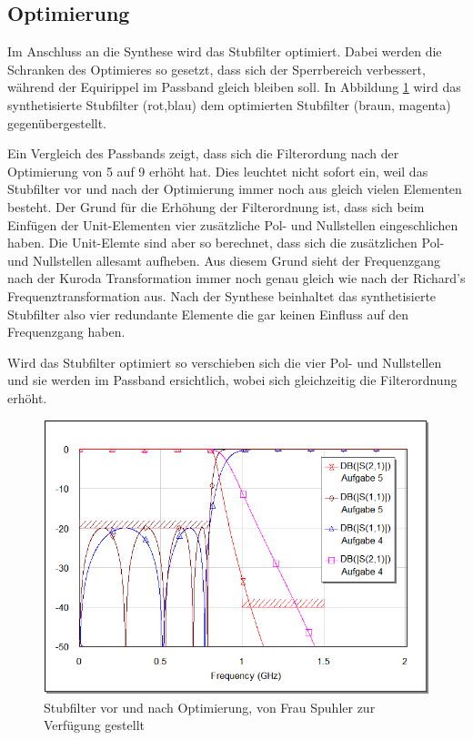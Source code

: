 \subsection{Optimierung}

Im Anschluss an die Synthese wird das Stubfilter optimiert. Dabei  werden  die
Schranken  des  Optimieres so gesetzt, dass sich der Sperrbereich  verbessert,
während  der  Equirippel  im   Passband  gleich  bleiben  soll.  In  Abbildung
\ref{fig:vor-nach-optimierung} wird  das  synthetisierte Stubfilter (rot,blau)
dem optimierten Stubfilter (braun, magenta) gegenübergestellt.

Ein Vergleich des  Passbands  zeigt,  dass  sich  die  Filterordung  nach  der
Optimierung  von 5 auf 9 erhöht hat. Dies leuchtet nicht sofort ein, weil  das
Stubfilter vor und nach der Optimierung immer noch aus gleich vielen Elementen
besteht.  Der  Grund  für die Erhöhung der Filterordnung ist, dass  sich  beim
Einfügen   der   Unit-Elementen   vier   zusätzliche   Pol-  und   Nullstellen
eingeschlichen  haben. Die Unit-Elemte sind aber so berechnet, dass  sich  die
zusätzlichen  Pol- und Nullstellen allesamt aufheben. Aus diesem  Grund  sieht
der  Frequenzgang nach der Kuroda Transformation immer noch genau  gleich  wie
nach  der Richard's Frequenztransformation aus. Nach der  Synthese  beinhaltet
das synthetisierte  Stubfilter  also  vier  redundante Elemente die gar keinen
Einfluss auf den Frequenzgang haben.

Wird  das  Stubfilter   optimiert  so  verschieben  sich  die  vier  Pol-  und
Nullstellen  und sie werden im Passband ersichtlich, wobei  sich  gleichzeitig
die Filterordnung erhöht.


\begin{figure}[h!]
    \centering
    \includegraphics[width=\linewidth]{images/graph-optimierung}
    \caption{Stubfilter vor und nach Optimierung, von Frau Spuhler zur Verfügung gestellt}
    \label{fig:vor-nach-optimierung}
\end{figure}


